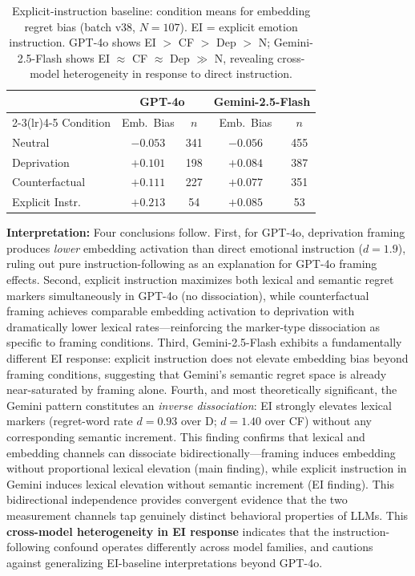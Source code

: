 \documentclass[11pt]{article}
\begin{document}
\begin{table}[h]
\centering\small
\caption{Explicit-instruction baseline: condition means for embedding regret bias (batch v38, $N=107$). EI = explicit emotion instruction. GPT-4o shows EI $>$ CF $>$ Dep $>$ N; Gemini-2.5-Flash shows EI $\approx$ CF $\approx$ Dep $\gg$ N, revealing cross-model heterogeneity in response to direct instruction.}
\label{tab:ei_baseline}
\begin{tabular}{lcccc}
\toprule
 & \multicolumn{2}{c}{GPT-4o} & \multicolumn{2}{c}{Gemini-2.5-Flash} \\
\cmidrule(lr){2-3}\cmidrule(lr){4-5}
Condition & Emb.\ Bias & $n$ & Emb.\ Bias & $n$ \\
\midrule
Neutral & $-0.053$ & 341 & $-0.056$ & 455 \\
Deprivation & $+0.101$ & 198 & $+0.084$ & 387 \\
Counterfactual & $+0.111$ & 227 & $+0.077$ & 351 \\
Explicit Instr. & $+0.213$ & 54 & $+0.085$ & 53 \\
\bottomrule
\end{tabular}
\end{table}

\textbf{Interpretation:} Four conclusions follow. First, for GPT-4o, deprivation framing produces \emph{lower} embedding activation than direct emotional instruction ($d=1.9$), ruling out pure instruction-following as an explanation for GPT-4o framing effects. Second, explicit instruction maximizes both lexical and semantic regret markers simultaneously in GPT-4o (no dissociation), while counterfactual framing achieves comparable embedding activation to deprivation with dramatically lower lexical rates---reinforcing the marker-type dissociation as specific to framing conditions. Third, Gemini-2.5-Flash exhibits a fundamentally different EI response: explicit instruction does not elevate embedding bias beyond framing conditions, suggesting that Gemini's semantic regret space is already near-saturated by framing alone. Fourth, and most theoretically significant, the Gemini pattern constitutes an \emph{inverse dissociation}: EI strongly elevates lexical markers (regret-word rate $d=0.93$ over D; $d=1.40$ over CF) without any corresponding semantic increment. This finding confirms that lexical and embedding channels can dissociate bidirectionally---framing induces embedding without proportional lexical elevation (main finding), while explicit instruction in Gemini induces lexical elevation without semantic increment (EI finding). This bidirectional independence provides convergent evidence that the two measurement channels tap genuinely distinct behavioral properties of LLMs. This \textbf{cross-model heterogeneity in EI response} indicates that the instruction-following confound operates differently across model families, and cautions against generalizing EI-baseline interpretations beyond GPT-4o.
\end{document}
